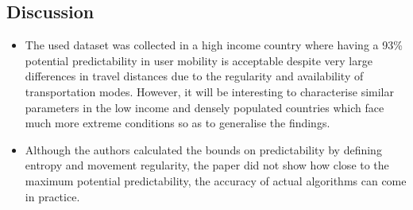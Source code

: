 \subsection*{Discussion}
\begin{itemize}


\item The used dataset was collected in a high income country where having a 93\% potential predictability
in user mobility is acceptable despite very large differences in travel distances due to the regularity 
and availability of transportation modes. However, it will be interesting to characterise similar parameters 
in the low income and densely populated countries which face much more extreme conditions
so as to generalise the findings.  

\item Although the authors calculated the bounds on predictability by defining entropy and movement regularity, 
the paper did not show how close to the maximum potential predictability, the accuracy of actual algorithms can 
come in practice. 
\end{itemize}